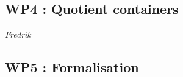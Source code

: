 \documentclass[twocolumn,a4paper,11pt]{article}
\begin{document}




\subsection*{WP4 : Quotient containers} 

\emph{Fredrik}

\subsection*{WP5 : Formalisation} 
\end{document}
